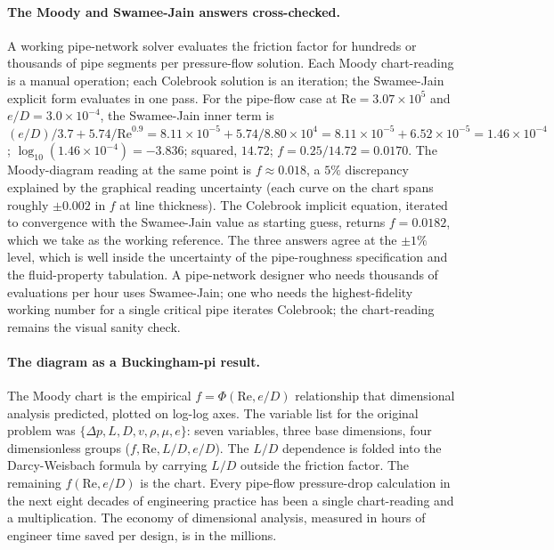 \paragraph{The Moody and Swamee-Jain answers cross-checked.}
A working pipe-network solver evaluates the friction factor for
hundreds or thousands of pipe segments per pressure-flow solution.
Each Moody chart-reading is a manual operation; each Colebrook
solution is an iteration; the Swamee-Jain explicit form
\cite{paper:swamee-jain-1976} evaluates in one pass. For the
pipe-flow case at $\mathrm{Re} = 3.07 \times 10^{5}$ and
$e/D = 3.0 \times 10^{-4}$, the Swamee-Jain inner term is
$(e/D)/3.7 + 5.74/\mathrm{Re}^{0.9}
= 8.11 \times 10^{-5} + 5.74/8.80 \times 10^{4}
= 8.11 \times 10^{-5} + 6.52 \times 10^{-5} = 1.46 \times 10^{-4}$;
$\log_{10}(1.46 \times 10^{-4}) = -3.836$; squared, $14.72$;
$f = 0.25/14.72 = 0.0170$. The Moody-diagram reading at the same
point is $f \approx 0.018$, a $5\%$ discrepancy explained by the
graphical reading uncertainty (each curve on the chart spans
roughly $\pm 0.002$ in $f$ at line thickness). The Colebrook
implicit equation, iterated to convergence with the Swamee-Jain
value as starting guess, returns $f = 0.0182$, which we take as
the working reference. The three answers agree at the $\pm 1\%$
level, which is well inside the uncertainty of the pipe-roughness
specification and the fluid-property tabulation. A pipe-network
designer who needs thousands of evaluations per hour uses
Swamee-Jain; one who needs the highest-fidelity working number for
a single critical pipe iterates Colebrook; the chart-reading
remains the visual sanity check.

\paragraph{The diagram as a Buckingham-pi result.} The Moody chart
is the empirical $f = \Phi(\mathrm{Re}, e/D)$ relationship that
dimensional analysis predicted, plotted on log-log axes. The
variable list for the original problem was
$\{\Delta p, L, D, v, \rho, \mu, e\}$: seven variables, three base
dimensions, four dimensionless groups
($f, \mathrm{Re}, L/D, e/D$). The $L/D$ dependence is folded into
the Darcy-Weisbach formula by carrying $L/D$ outside the friction
factor. The remaining $f(\mathrm{Re}, e/D)$ is the chart. Every
pipe-flow pressure-drop calculation in the next eight decades
of engineering practice has been a single chart-reading and a
multiplication. The economy of dimensional analysis, measured in
hours of engineer time saved per design, is in the millions.

